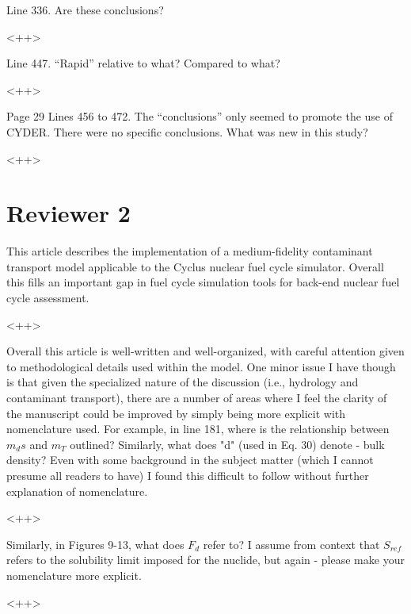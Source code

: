 \documentclass[answers,12pt]{exam}
\begin{document}
\begin{questions}
 

\question Line 336. Are these conclusions?
\begin{solution}
<++>
\end{solution}

 

\question Line 447. “Rapid” relative to what? Compared to what?
\begin{solution}
<++>
\end{solution}

 

\question Page 29 Lines 456 to 472. The “conclusions” only seemed to promote the use of CYDER. There were no specific conclusions. What was new in this study? 
\begin{solution}
<++>
\end{solution}


\section*{Reviewer 2}



\question This article describes the implementation of a medium-fidelity contaminant transport model applicable to the Cyclus nuclear fuel cycle simulator. Overall this fills an important gap in fuel cycle simulation tools for back-end nuclear fuel cycle assessment.
\begin{solution}
<++>
\end{solution}

\question Overall this article is well-written and well-organized, with careful attention given to methodological details used within the model. One minor issue I have though is that given the specialized nature of the discussion (i.e., hydrology and contaminant transport), there are a number of areas where I feel the clarity of the manuscript could be improved by simply being more explicit with nomenclature used. For example, in line 181, where is the relationship between $m_ds$ and $m_T$ outlined? Similarly, what does "d" (used in Eq. 30) denote - bulk density? Even with some background in the subject matter (which I cannot presume all readers to have) I found this difficult to follow without further explanation of nomenclature.
\begin{solution}
<++>
\end{solution}

\question Similarly, in Figures 9-13, what does $F_d$ refer to? I assume from 
context that $S_{ref}$ refers to the solubility limit imposed for the nuclide, but again - please make your nomenclature more explicit. 
\begin{solution}
<++>
\end{solution}


\end{questions}
\end{document}
